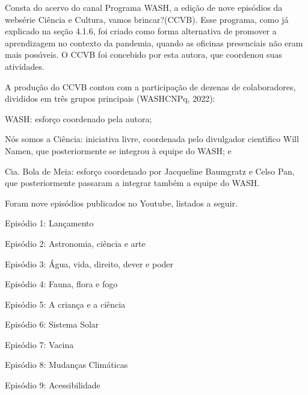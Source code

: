 \documentclass[
12pt,		%
openright,	%
twoside,  %
a4paper,			%
chapter=TITLE,		%
english,			%
french,				%
spanish,			%
brazil				%
]{USPSC-classe/USPSC}
\begin{document}
Consta do acervo do canal \textquotedbl Programa WASH\textquotedbl , a edi\c{c}\~ao de nove epis\'odios da webs\'erie \textquotedbl Ci\^encia e Cultura, vamos brincar?\textquotedbl  (CCVB). Esse programa, como j\'a explicado na se\c{c}\~ao 4.1.6, foi criado como forma alternativa de promover a aprendizagem no contexto da pandemia, quando as oficinas presenciais n\~ao eram mais poss\'{\i}veis. O CCVB foi concebido por esta autora, que coordenou suas atividades.

















A produ\c{c}\~ao do CCVB contou com a participa\c{c}\~ao de dezenas de colaboradores, divididos em tr\^es grupos principais (WASHCNPq, 2022):


















\begin{alineas}
\item WASH: esfor\c{c}o coordenado pela autora;
\item \textquotedbl N\'os somos a Ci\^encia\textquotedbl : iniciativa livre, coordenada pelo divulgador cient\'{\i}fico Will Namen, que posteriormente se integrou \`a equipe do WASH; e
\item Cia. Bola de Meia: esfor\c{c}o coordenado por Jacqueline Baumgratz e Celso Pan, que posteriormente passaram  a integrar tamb\'em a equipe do WASH.
\end{alineas}

Foram nove epis\'odios publicados no Youtube, listados a seguir.


















\begin{alineas}
\item Epis\'odio 1: Lan\c{c}amento
\item Epis\'odio 2: Astronomia, ci\^encia e arte
\item Epis\'odio 3: \'Agua, vida, direito, dever e poder
\item Epis\'odio 4: Fauna, flora e fogo
\item Epis\'odio 5: A crian\c{c}a e a ci\^encia
\item Epis\'odio 6: Sistema Solar
\item Epis\'odio 7: Vacina
\item Epis\'odio 8: Mudan\c{c}as Clim\'aticas
\item Epis\'odio 9: Acessibilidade
\end{alineas}
\end{document}
